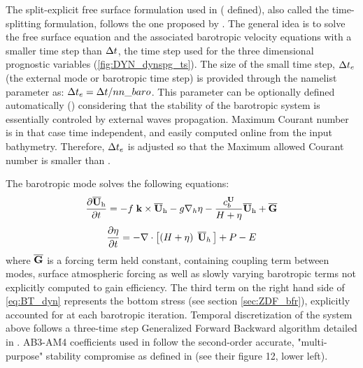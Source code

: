 \documentclass[../main/NEMO_manual]{subfiles}
\begin{document}
The split-explicit free surface formulation used in \NEMO ( defined),
also called the time-splitting formulation, follows the one proposed by \citet{Shchepetkin_McWilliams_OM05}.
The general idea is to solve the free surface equation and the associated barotropic velocity equations with
a smaller time step than $\Delta t$, the time step used for the three dimensional prognostic variables
(\autoref{fig:DYN_dynspg_ts}).
The size of the small time step, $\Delta t_e$ (the external mode or barotropic time step) is provided through
the  namelist parameter as: $\Delta t_e = \Delta t / nn\_baro$.
This parameter can be optionally defined automatically () considering that
the stability of the barotropic system is essentially controled by external waves propagation.
Maximum Courant number is in that case time independent, and easily computed online from the input bathymetry.
Therefore, $\Delta t_e$ is adjusted so that the Maximum allowed Courant number is smaller than .

The barotropic mode solves the following equations:
\begin{equation}
  \label{eq:BT_dyn}
  \frac{\partial {\rm \overline{{\bf U}}_h} }{\partial t}=
  -f\;{\rm {\bf k}}\times {\rm \overline{{\bf U}}_h}
  -g\nabla _h \eta -\frac{c_b^{\textbf U}}{H+\eta} \rm {\overline{{\bf U}}_h} + \rm {\overline{\bf G}}
\end{equation}
\[
  \frac{\partial \eta }{\partial t}=-\nabla \cdot \left[ {\left( {H+\eta } \right) \; {\rm{\bf \overline{U}}}_h \,} \right]+P-E
\]
where $\rm {\overline{\bf G}}$ is a forcing term held constant, containing coupling term between modes,
surface atmospheric forcing as well as slowly varying barotropic terms not explicitly computed to gain efficiency.
The third term on the right hand side of \autoref{eq:BT_dyn} represents the bottom stress
(see section \autoref{sec:ZDF_bfr}), explicitly accounted for at each barotropic iteration.
Temporal discretization of the system above follows a three-time step Generalized Forward Backward algorithm
detailed in \citet{Shchepetkin_McWilliams_OM05}.
AB3-AM4 coefficients used in \NEMO follow the second-order accurate,
"multi-purpose" stability compromise as defined in \citet{Shchepetkin_McWilliams_Bk08}
(see their figure 12, lower left). 
\end{document}
